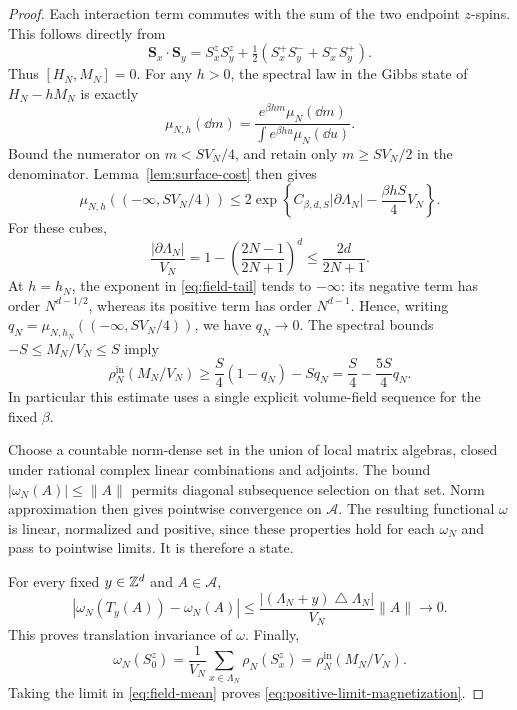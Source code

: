 \begin{proof}
Each interaction term commutes with the sum of the two endpoint
\(z\)-spins.  This follows directly from
\[
 \mathbf S_x\cdot\mathbf S_y
 =S_x^zS_y^z+\tfrac12(S_x^+S_y^-+S_x^-S_y^+).
\]
Thus \([H_N,M_N]=0\).  For any \(h>0\), the spectral law in the
Gibbs state of \(H_N-hM_N\) is exactly
\[
 \mu_{N,h}(\dd m)
 =\frac{e^{\beta hm}\mu_N(\dd m)}
        {\int e^{\beta hu}\mu_N(\dd u)}.
\]
Bound the numerator on \(m<SV_N/4\), and retain only
\(m\geq SV_N/2\) in the denominator.  Lemma~\ref{lem:surface-cost}
then gives
\begin{equation}\label{eq:field-tail}
 \mu_{N,h}(({-\infty},SV_N/4))
 \leq 2\exp\left\{
       C_{\beta,d,S}|\partial\Lambda_N|-\frac{\beta hS}{4}V_N
       \right\}.
\end{equation}
For these cubes,
\[
 \frac{|\partial\Lambda_N|}{V_N}
 =1-\left(\frac{2N-1}{2N+1}\right)^d
 \leq\frac{2d}{2N+1}.
\]
At \(h=h_N\), the exponent in \eqref{eq:field-tail} tends to
\(-\infty\): its negative term has order \(N^{d-1/2}\), whereas
its positive term has order \(N^{d-1}\).  Hence, writing
\(q_N=\mu_{N,h_N}(({-\infty},SV_N/4))\), we have \(q_N\to0\).
The spectral bounds \(-S\leq M_N/V_N\leq S\) imply
\begin{equation}\label{eq:field-mean}
 \rho_N^{\mathrm{in}}(M_N/V_N)
 \geq\frac S4(1-q_N)-Sq_N
 =\frac S4-\frac{5S}{4}q_N.
\end{equation}
In particular this estimate uses a single explicit volume-field
sequence for the fixed \(\beta\).

Choose a countable norm-dense set in the union of local matrix
algebras, closed under rational complex linear combinations and
adjoints.  The bound \(|\omega_N(A)|\leq\|A\|\) permits diagonal
subsequence selection on that set.  Norm approximation then gives
pointwise convergence on \(\mathcal A\).  The resulting functional
\(\omega\) is linear, normalized and positive, since these properties
hold for each \(\omega_N\) and pass to pointwise limits.  It is
therefore a state.

For every fixed \(y\in\mathbb Z^d\) and \(A\in\mathcal A\),
\[
 |\omega_N(T_y(A))-\omega_N(A)|
 \leq\frac{|(\Lambda_N+y)\mathbin\triangle\Lambda_N|}{V_N}\|A\|
 \longrightarrow0.
\]
This proves translation invariance of \(\omega\).  Finally,
\[
 \omega_N(S_0^z)
 =\frac1{V_N}\sum_{x\in\Lambda_N}\rho_N(S_x^z)
 =\rho_N^{\mathrm{in}}(M_N/V_N).
\]
Taking the limit in \eqref{eq:field-mean} proves
\eqref{eq:positive-limit-magnetization}.
\end{proof}

